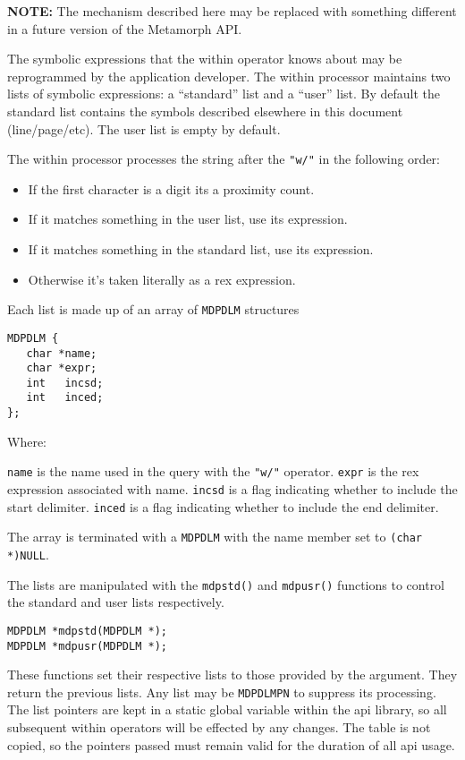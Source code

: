 {\bf NOTE:} The mechanism described here may be replaced with something
different in a future version of the Metamorph API.

The symbolic expressions that the within operator knows about may
be reprogrammed by the application developer.  The within
processor maintains two lists of symbolic expressions:  a
``standard'' list and a ``user'' list.  By default the standard list
contains the symbols described elsewhere in this document
(line/page/etc).  The user list is empty by default.

The within processor processes the string after the \verb`"w/"` in the
following order:

\begin{itemize}
\item If the first character is a digit its a proximity count.
\item If it matches something in the user list, use its expression.
\item If it matches something in the standard list, use its expression.
\item Otherwise it's taken literally as a rex expression.
\end{itemize}

Each list is made up of an array of \verb`MDPDLM` structures
\begin{verbatim}
MDPDLM {
   char *name;
   char *expr;
   int   incsd;
   int   inced;
};
\end{verbatim}

Where:

\verb`name` is the name used in the query with the \verb`"w/"` operator.
\verb`expr` is the rex expression associated with name.
\verb`incsd` is a flag indicating whether to include the start delimiter.
\verb`inced` is a flag indicating whether to include the end delimiter.

The array is terminated with a \verb`MDPDLM` with the name member set to
\verb`(char *)NULL`.

The lists are manipulated with the \verb`mdpstd()` and \verb`mdpusr()` functions
to control the standard and user lists respectively.

\begin{verbatim}
MDPDLM *mdpstd(MDPDLM *);
MDPDLM *mdpusr(MDPDLM *);
\end{verbatim}

These functions set their respective lists to those provided by
the argument.  They return the previous lists.  Any list may be
\verb`MDPDLMPN` to suppress its processing.  The list pointers are kept
in a static global variable within the api library, so all
subsequent within operators will be effected by any changes.  The
table is not copied, so the pointers passed must remain valid for
the duration of all api usage.

